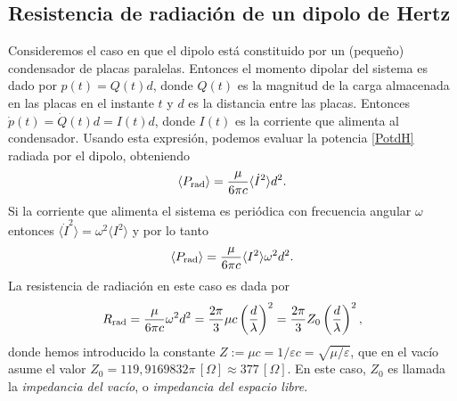 \subsection{Resistencia de radiación de un dipolo de Hertz}\label{sec:RRdH}
Consideremos el caso en que el dipolo está constituido por un (pequeño) condensador de placas paralelas. Entonces el momento dipolar del sistema es dado por $p(t)=Q(t)d$, donde $Q(t)$ es la magnitud de la carga almacenada en las placas en el instante $t$ y $d$ es la distancia entre las placas. Entonces $\dot{p}(t)=\dot{Q}(t)d=I(t)d$, donde $I(t)$ es la corriente que alimenta al condensador. Usando esta expresión, podemos evaluar la potencia \eqref{PotdH} radiada por el dipolo, obteniendo
\begin{equation}
\left\langle P_{\rm rad}\right\rangle=\frac{\mu}{6\pi c}{\langle\dot{I}^2\rangle d^2}.
\end{equation}
Si la corriente que alimenta el sistema es periódica con frecuencia angular $\omega$ entonces $\langle\dot{I}^2\rangle=\omega^2\langle I^2\rangle$ y por lo tanto
\begin{equation}
\left\langle P_{\rm rad}\right\rangle=\frac{\mu}{6\pi c}{\langle I^2\rangle \omega^2d^2}.
\end{equation}
La resistencia de radiación en este caso es dada por
\begin{equation}\label{Rradp}
R_{\rm rad}=\frac{\mu}{6\pi c}{\omega^2d^2}
=\frac{2\pi}{3}\mu c\left(\frac{d}{\lambda}\right)^2
=\frac{2\pi}{3}Z_0\left(\frac{d}{\lambda}\right)^2,
\end{equation}
donde hemos introducido la constante $Z:=\mu c=1/\varepsilon c=\sqrt{\mu/\varepsilon}$, que en el vacío asume el valor $Z_0=119,9169832\pi\,[\Omega]\approx 377\,[\Omega]$. En este caso, $Z_0$ es llamada la \textit{impedancia del vacío}, o \textit{impedancia del espacio libre}.

